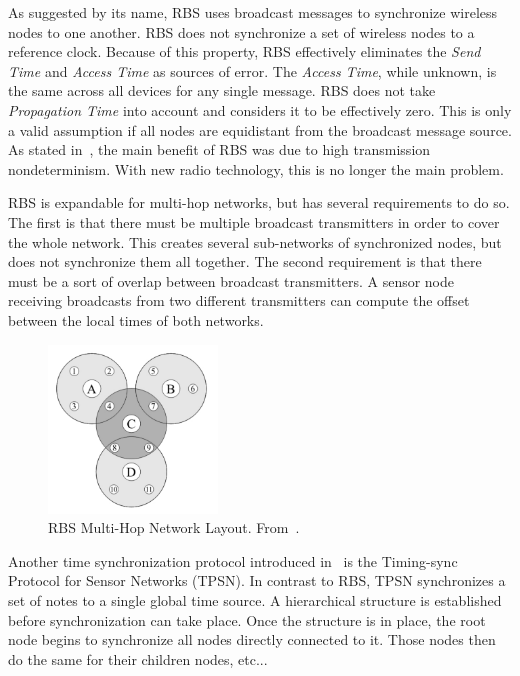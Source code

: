 As suggested by its name, RBS uses broadcast messages to synchronize wireless nodes to one another. RBS does not synchronize a set of wireless nodes to a reference clock. Because of this property, RBS effectively eliminates the \emph{Send Time} and \emph{Access Time} as sources of error. The \emph{Access Time}, while unknown, is the same across all devices for any single message. RBS does not take \emph{Propagation Time} into account and considers it to be effectively zero. This is only a valid assumption if all nodes are equidistant from the broadcast message source. As stated in~\cite{synchronization:VHT}, the main benefit of RBS was due to high transmission nondeterminism. With new radio technology, this is no longer the main problem.

RBS is expandable for multi-hop networks, but has several requirements to do so. The first is that there must be multiple broadcast transmitters in order to cover the whole network. This creates several sub-networks of synchronized nodes, but does not synchronize them all together. The second requirement is that there must be a sort of overlap between broadcast transmitters. A sensor node receiving broadcasts from two different transmitters can compute the offset between the local times of both networks. 
\begin{figure}[htb]
\begin{center}
\includegraphics[width=0.4\textwidth]{figures/RBS_multihop.pdf}
\end{center}
\caption{RBS Multi-Hop Network Layout. From~\cite{synchronization:RBS}.}
\label{fig:RBS_multihop}
\end{figure}

Another time synchronization protocol introduced in~\cite{synchronization:TPSN} is the Timing-sync Protocol for Sensor Networks (TPSN). In contrast to RBS, TPSN synchronizes a set of notes to a single global time source. A hierarchical structure is established before synchronization can take place. Once the structure is in place, the root node begins to synchronize all nodes directly connected to it. Those nodes then do the same for their children nodes, etc...

